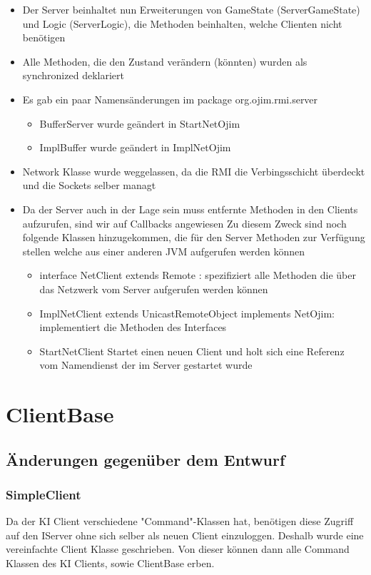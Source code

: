 \documentclass[a4paper,10pt]{article}
\begin{document}
\begin{itemize}
\begin{itemize}
\begin{itemize}
\end{itemize}
\item Der Server beinhaltet nun Erweiterungen von GameState (ServerGameState) und Logic (ServerLogic), die Methoden beinhalten, welche Clienten nicht benötigen
\item Alle Methoden, die den Zustand verändern (könnten) wurden als synchronized deklariert
\item Es gab ein paar Namensänderungen im package org.ojim.rmi.server 
\begin{itemize}
\item BufferServer wurde geändert in StartNetOjim
\item ImplBuffer wurde geändert in ImplNetOjim
\end{itemize}
\item Network Klasse wurde weggelassen, da die RMI die Verbingsschicht überdeckt und die Sockets selber managt
\item Da der Server auch in der Lage sein muss entfernte Methoden in den Clients aufzurufen, sind wir auf Callbacks angewiesen Zu diesem Zweck sind noch folgende Klassen hinzugekommen, die für den Server Methoden zur Verfügung stellen welche aus einer anderen JVM aufgerufen werden können
\begin{itemize}
\item interface NetClient extends Remote : spezifiziert alle Methoden die über das Netzwerk vom Server aufgerufen werden können 
\item ImplNetClient extends UnicastRemoteObject implements NetOjim: implementiert die Methoden des Interfaces
\item StartNetClient Startet einen neuen Client und holt sich eine Referenz vom Namendienst der im Server gestartet wurde
\end{itemize}
\end{itemize}
\newpage
\section{ClientBase}
\subsection {Änderungen gegenüber dem Entwurf}
\subsubsection{SimpleClient}
Da der KI Client verschiedene "Command"-Klassen hat, benötigen diese Zugriff auf den IServer ohne sich selber als neuen Client einzuloggen. Deshalb wurde eine vereinfachte Client Klasse geschrieben. Von dieser können dann alle Command Klassen des KI Clients, sowie ClientBase erben.


\end{itemize}
\end{document}
